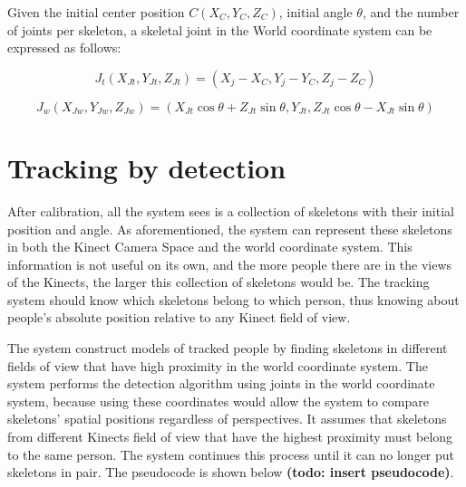 Given the initial center position $C(X_C, Y_C, Z_C)$, initial angle $\theta$, and the number of joints per skeleton, a skeletal joint in the World coordinate system can be expressed as follows:

\begin{equation}
\label{eq:joint_translated}
J_t (X_{Jt}, Y_{Jt}, Z_{Jt}) = (X_j - X_C, Y_j - Y_C, Z_j - Z_C)
\end{equation}

\begin{equation}
\label{eq:joint_worldview}
J_w (X_{Jw}, Y_{Jw}, Z_{Jw}) = (X_{Jt}\cos\theta + Z_{Jt}\sin\theta, Y_{Jt}, Z_{Jt}\cos\theta - X_{Jt}\sin\theta)
\end{equation}




\section{Tracking by detection}
\label{sec:current_approach_tracking_by_detection}

After calibration, all the system sees is a collection of skeletons with their initial position and angle. As aforementioned, the system can represent these skeletons in both the Kinect Camera Space and the world coordinate system. This information is not useful on its own, and the more people there are in the views of the Kinects, the larger this collection of skeletons would be. The tracking system should know which skeletons belong to which person, thus knowing about people's absolute position relative to any Kinect field of view.

The system construct models of tracked people by finding skeletons in different fields of view that have high proximity in the world coordinate system. The system performs the detection algorithm using joints in the world coordinate system, because using these coordinates would allow the system to compare skeletons' spatial positions regardless of perspectives. It assumes that skeletons from different Kinects field of view that have the highest proximity must belong to the same person. The system continues this process until it can no longer put skeletons in pair. The pseudocode is shown below \textbf{(todo: insert pseudocode)}.

